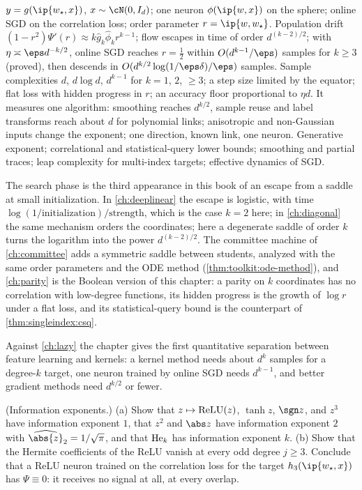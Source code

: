 \begin{refsection}
{$y=g(\ip{w_\star,x})$, $x\sim\cN(0,I_d)$; one neuron $\phi(\ip{w,x})$ on the sphere; online SGD on the correlation loss; order parameter $r=\ip{w,w_\star}$.}
{Population drift $(1-r^2)\Psi'(r)\approx k\hat g_k\hat\phi_kr^{k-1}$; flow escapes in time of order $d^{(k-2)/2}$; with $\eta\asymp\eps d^{-k/2}$, online SGD reaches $r=\frac12$ within $O(d^{k-1}/\eps)$ samples for $k\ge3$ (proved), then descends in $O(d^{k/2}\log(1/\eps\delta)/\eps)$ samples.}
{Sample complexities $d$, $d\log d$, $d^{k-1}$ for $k=1$, $2$, $\ge3$; a step size limited by the equator; flat loss with hidden progress in $r$; an accuracy floor proportional to $\eta d$.}
{It measures one algorithm: smoothing reaches $d^{k/2}$, sample reuse and label transforms reach about $d$ for polynomial links; anisotropic and non-Gaussian inputs change the exponent; one direction, known link, one neuron.}
{Generative exponent; correlational and statistical-query lower bounds; smoothing and partial traces; leap complexity for multi-index targets; effective dynamics of SGD.}

The search phase is the third appearance in this book of an escape from a saddle at small initialization. In \cref{ch:deeplinear} the escape is logistic, with time $\log(1/\text{initialization})/\text{strength}$, which is the case $k=2$ here; in \cref{ch:diagonal} the same mechanism orders the coordinates; here a degenerate saddle of order $k$ turns the logarithm into the power $d^{(k-2)/2}$. The committee machine of \cref{ch:committee} adds a symmetric saddle between students, analyzed with the same order parameters and the ODE method (\cref{thm:toolkit:ode-method}), and \cref{ch:parity} is the Boolean version of this chapter: a parity on $k$ coordinates has no correlation with low-degree functions, its hidden progress is the growth of $\log r$ under a flat loss, and its statistical-query bound is the counterpart of \cref{thm:singleindex:csq}.

Against \cref{ch:lazy} the chapter gives the first quantitative separation between feature learning and kernels: a kernel method needs about $d^k$ samples for a degree-$k$ target, one neuron trained by online SGD needs $d^{k-1}$, and better gradient methods need $d^{k/2}$ or fewer.

\begin{exercises}
\item \consolidation (Information exponents.) (a) Show that $z\mapsto\operatorname{ReLU}(z)$, $\tanh z$, $\sgn z$, and $z^3$ have information exponent $1$, that $z^2$ and $\abs z$ have information exponent $2$ with $\widehat{\abs{z}}_2=1/\sqrt\pi$, and that $\operatorname{He}_k$ has information exponent $k$. (b) Show that the Hermite coefficients of the ReLU vanish at every odd degree $j\ge3$. Conclude that a ReLU neuron trained on the correlation loss for the target $h_3(\ip{w_\star,x})$ has $\Psi\equiv0$: it receives no signal at all, at every overlap. \label{ex:singleindex:exponents}


\end{exercises}
\end{refsection}
